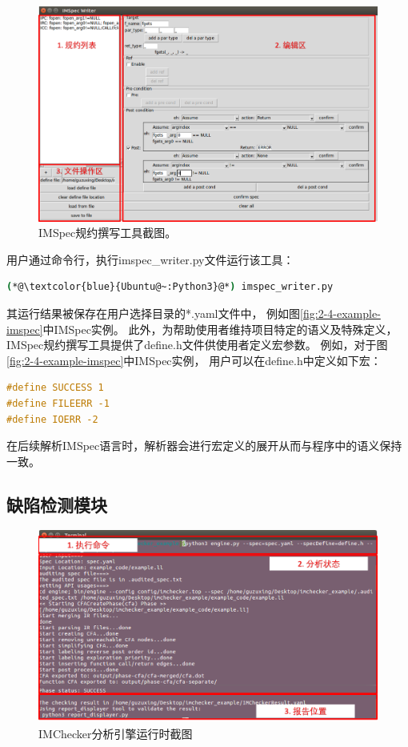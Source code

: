 \begin{figure}[t]
	\centering
	\includegraphics[width=0.85\linewidth]{figures/cp4-IMSpec-writer.png}
	\caption{
		IMSpec规约撰写工具截图。
	}
	\label{fig:4-3-IMSpec-writer}
\end{figure}

用户通过命令行，执行imspec\_writer.py文件运行该工具：
\begin{lstlisting}[language={bash},
basicstyle=\linespread{0.8}\listingsfont,
numbers=none,
xleftmargin=.3\textwidth]
(*@\textcolor{blue}{Ubuntu@~:Python3}@*) imspec_writer.py
\end{lstlisting}
其运行结果被保存在用户选择目录的*.yaml文件中，
例如图\ref{fig:2-4-example-imspec}中IMSpec实例。
此外，为帮助使用者维持项目特定的语义及特殊定义，
IMSpec规约撰写工具提供了define.h文件供使用者定义宏参数。
例如，对于图\ref{fig:2-4-example-imspec}中IMSpec实例，
用户可以在define.h中定义如下宏：
\begin{lstlisting}[language={C},
basicstyle=\linespread{0.8}\listingsfont,
numbers=none,
xleftmargin=.3\textwidth]
#define SUCCESS 1
#define FILEERR -1
#define IOERR -2
\end{lstlisting}
在后续解析IMSpec语言时，解析器会进行宏定义的展开从而与程序中的语义保持一致。




\subsection{缺陷检测模块}
\begin{figure}[b]
	\centering
	\includegraphics[width=0.85\linewidth]{figures/cp4-IMChecker-engine.png}
	\caption{
		IMChecker分析引擎运行时截图
	}
	\label{fig:4-3-IMChecker-engine}
\end{figure}

